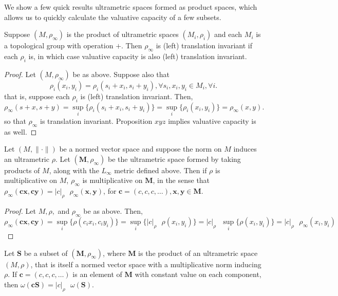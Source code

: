 We show a few quick results ultrametric spaces formed as product spaces, which allows us to quickly calculate the valuative capacity of a few subsets. 

\begin{proposition*}
Suppose $(M,\rho_\infty)$ is the product of ultrametric spaces $(M_i, \rho_i)$ and each $M_i$ is a topological group with operation $+$. Then $\rho_\infty$ is (left) translation invariant if each $\rho_i$ is, in which case valuative capacity is also (left) translation invariant.
\end{proposition*}

\begin{proof}
Let $(M,\rho_\infty)$ be as above. Suppose also that \[\rho_i(x_i,y_i) = \rho_i(s_i + x_i, s_i +y_i), \forall s_i, x_i, y_i \in M_i, \forall i.\] that is, suppose each $\rho_i$ is (left) translation invariant. Then,  
\[
\rho_\infty(s +x, s+y)  
= \sup_i\{\rho_i(s_i +x_i, s_i + y_i)\} 
= \sup_i\{\rho_i(x_i, y_i)\}
= \rho_\infty(x,y).
\] so that $\rho_\infty$ is translation invariant.  Proposition $xyz$ implies valuative capacity is as well. 
\end{proof}


\begin{proposition*}
Let $(M, \lVert \cdot \rVert)$ be a normed vector space and suppose the norm on $M$ induces an ultrametric $\rho$. Let $(\textbf{M}, \rho_{\infty})$ be the ultrametric space formed by taking products of $M$, along with the $L_\infty$ metric defined above.  Then if $\rho$ is multiplicative on $M$, $\rho_{\infty}$ is multiplicative on $\textbf{M}$, in the sense that $\rho_{\infty}(\textbf{cx},\textbf{cy}) = \lvert c\rvert_\rho \text{ } \rho_\infty (\textbf{x},\textbf{y})$, for $\textbf{c}=(c,c,c,\ldots) ,\textbf{x},\textbf{y} \in \textbf{M}$.
\end{proposition*}

\begin{proof}
Let $M, \rho,$ and $\rho_{\infty}$ be as above. Then, 
\[
\rho_\infty(\textbf{cx}, \textbf{cy}) 
= \sup_i\{\rho(c_i x_i, c_i y_i)\} 
= \sup_i\{\vert c \rvert_\rho \text{ }  \rho(x_i, y_i)\}
= \vert c \rvert_\rho \text{ } \sup_i\{\rho(x_i,y_i)\}
= \vert c \rvert_\rho \text{ } \rho_\infty(x_i,y_i)
\]

\end{proof}

\begin{corollary*}
Let $\textbf{S}$ be a subset of $(\textbf{M}, \rho_\infty)$, where $\textbf{M}$ is the product of an ultrametric space $(M, \rho)$, that is itself a normed vector space with a multiplicative norm inducing $\rho$. If $\textbf{c}=(c,c,c,\ldots)$ is an element of $\textbf{M}$ with constant value on each component, then $\omega(\textbf{cS})=\lvert c \rvert_\rho \text{ }\omega(\textbf{S})$.
\end{corollary*}

